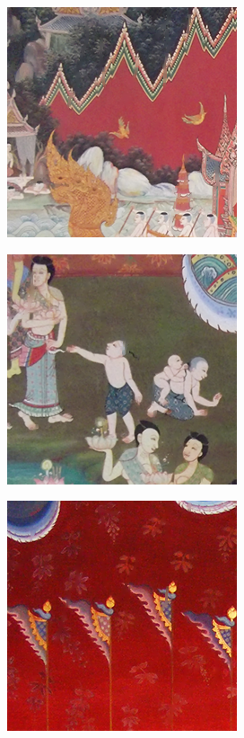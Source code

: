 \begin{figure}[H]
    \centering
    \begin{subfigure}{\ResultSubFigureWidth \linewidth}
        \centering
        \includegraphics[width=\ResultSubFigurePadding \linewidth]{image/result_ex4/multisplitbergman_case01.png}
    \end{subfigure}
    \begin{subfigure}{\ResultSubFigureWidth \linewidth}
        \centering
        \includegraphics[width=\ResultSubFigurePadding \linewidth]{image/result_ex4/multisplitbergman_case02.png}
    \end{subfigure}
    \begin{subfigure}{\ResultSubFigureWidth \linewidth}
        \centering
        \includegraphics[width=\ResultSubFigurePadding \linewidth]{image/result_ex4/multisplitbergman_case03.png}			

\end{subfigure}
\end{figure}
